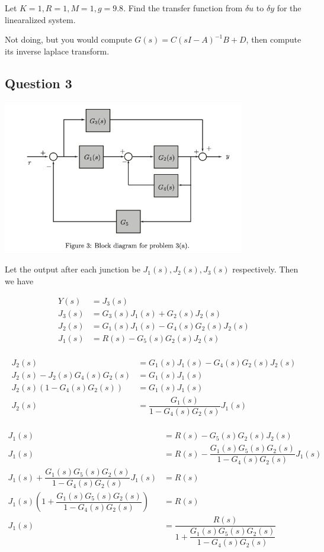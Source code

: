 \documentclass[11pt]{article}
\begin{document}
Let $K = 1, R = 1, M = 1, g = 9.8$. Find the transfer function from $\delta u$ to $\delta y$ for the linearalized system.

Not doing, but you would compute $G(s) = C(sI - A)^{-1}B + D$, then compute its inverse laplace transform.

\subsection{Question 3}

\includegraphics[width=300pt]{midterm_2012_q3.png}

Let the output after each junction be $J_1(s), J_2(s), J_3(s)$ respectively. Then we have

\begin{align*}
    Y(s) &= J_3(s) \\
    J_3(s) &= G_3(s) J_1(s) + G_2(s) J_2(s) \\
    J_2(s) &= G_1(s) J_1(s) - G_4(s) G_2(s) J_2(s) \\
    J_1(s) &= R(s) - G_5(s) G_2(s) J_2(s) \\
\end{align*}

\begin{align*}
    J_2(s) &= G_1(s) J_1(s) - G_4(s) G_2(s) J_2(s) \\
    J_2(s) -  J_2(s) G_4(s) G_2(s) &= G_1(s) J_1(s) \\
    J_2(s) (1 - G_4(s) G_2(s)) &= G_1(s) J_1(s) \\
    J_2(s) &= \dfrac{G_1(s)}{1 - G_4(s) G_2(s)} J_1(s) \\
\end{align*}

\begin{align*}
    J_1(s) &= R(s) - G_5(s) G_2(s) J_2(s) \\
    J_1(s) &= R(s) - \dfrac{G_1(s) G_5(s) G_2(s)}{1 - G_4(s) G_2(s)} J_1(s) \\
    J_1(s) + \dfrac{G_1(s) G_5(s) G_2(s)}{1 - G_4(s) G_2(s)} J_1(s) &= R(s) \\
    J_1(s) \left(1 + \dfrac{G_1(s) G_5(s) G_2(s)}{1 - G_4(s) G_2(s)} \right) &= R(s) \\
    J_1(s) &= \dfrac{R(s)}{1 + \dfrac{G_1(s) G_5(s) G_2(s)}{1 - G_4(s) G_2(s)}}  \\
\end{align*}
\end{document}
